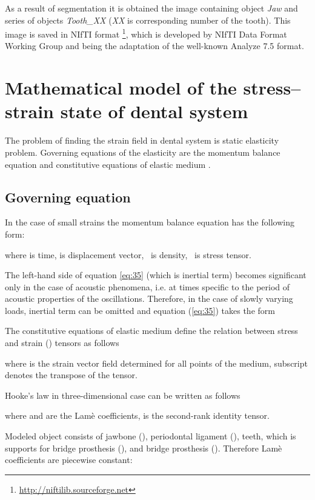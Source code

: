 \documentclass{elsarticle}
\begin{document}
As a result of segmentation it is obtained the image containing object
\emph{Jaw} and series of objects \emph{Tooth\_XX} (\emph{XX} is corresponding
number of the tooth). This image is saved in \textsf{NIfTI} format
\footnote{\url{http://niftilib.sourceforge.net}}, which is developed by
NIfTI Data Format Working Group and being the adaptation of the
well-known \textsf{Analyze 7.5} format.

\section{Mathematical model of the stress--strain state of dental
  system}
\label{sec:2}

The problem of finding the strain field in dental system is
static elasticity problem. Governing equations of the elasticity are
the momentum balance equation and constitutive equations of elastic medium
\cite{LandauLifshic1986,ciarlet1993mathematical}.

\subsection{Governing equation}

In the case of small strains the momentum balance equation has the
following form:

where  is time,  is displacement vector,  ~is
density, ~is stress tensor.

The left-hand side of equation \ref{eq:35} (which is inertial term)
becomes significant only in the case of acoustic phenomena, i.e. at
times specific to the period of acoustic properties of the
oscillations. Therefore, in the case of slowly varying loads, inertial
term can be omitted and equation (\ref{eq:35}) takes the form

The constitutive equations of elastic medium define the relation
between stress and strain () tensors as follows

where  is the strain vector field determined for all points
of the medium, subscript  denotes the transpose of the tensor.

Hooke's law in three-dimensional case can be written as follows

where  and  are the Lam\`e coefficients,
 is the second-rank identity tensor.

Modeled object consists of jawbone (), periodontal ligament
(), teeth, which is supports for bridge prosthesis
(), and bridge prosthesis (). Therefore Lam\`e
coefficients are piecewise constant:
\end{document}
